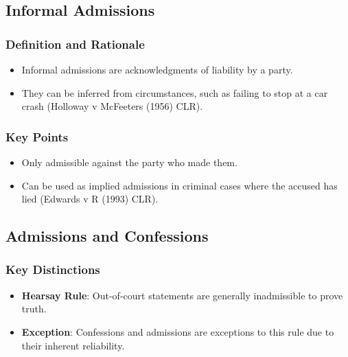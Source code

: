 \subsection{  Informal Admissions}\label{informal-admissions}

\subsubsection{Definition and Rationale}\label{definition-and-rationale}

\begin{itemize}
\tightlist
\item
  Informal admissions are acknowledgments of liability by a party.
\item
  They can be inferred from circumstances, such as failing to stop at a
  car crash (Holloway v McFeeters (1956) CLR).
\end{itemize}

\subsubsection{Key Points}\label{key-points-4}

\begin{itemize}
\tightlist
\item
  Only admissible against the party who made them.
\item
  Can be used as implied admissions in criminal cases where the accused
  has lied (Edwards v R (1993) CLR).
\end{itemize}

\subsection{ Admissions and
Confessions}\label{admissions-and-confessions}

\subsubsection{Key Distinctions}\label{key-distinctions}

\begin{itemize}
\tightlist
\item
  \textbf{Hearsay Rule}: Out-of-court statements are generally
  inadmissible to prove truth.
\item
  \textbf{Exception}: Confessions and admissions are exceptions to this
  rule due to their inherent reliability.
\end{itemize}

